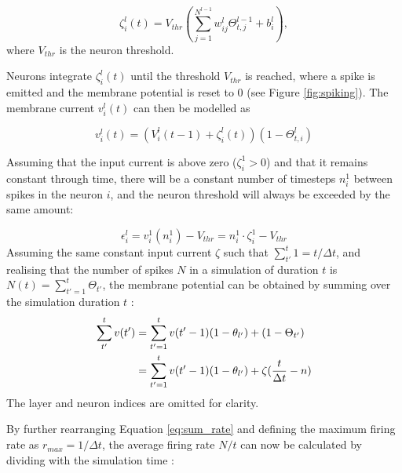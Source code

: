 \documentclass[report.tex]{subfiles}
\begin{document}
\begin{equation}
\zeta^l_i (t) = V_{thr}\left(\sum^{N^{l - 1}}_{j = 1} w^l_{ij} \Theta^{l - 1}_{t,j} + b^l_i\right) ,
\label{eq:membrane_timestep}
\end{equation}
\noindent
where $V_{thr}$ is the neuron threshold. 

Neurons integrate $\zeta_i^l(t)$ until the threshold $V_{thr}$ is 
reached, where a spike is emitted and the membrane potential is reset to 
0 (see Figure \ref{fig:spiking}).
The membrane current $v_i^l(t)$ can then be modelled as

\begin{equation}
v_i^l(t) = \left(V_i^l(t - 1) + \zeta_i^l(t)\right)\left(1 - \Theta_{t,i}^l\right)
\label{eq:membrane_current_sim}
\end{equation}

\noindent
Assuming that the input current is above zero ($\zeta_i^1 > 0$) and that it
remains constant through time, there will be a constant number of timesteps $n_i^1$
between spikes in the neuron $i$, and the neuron threshold will always be exceeded
by the same amount:

\begin{equation}
\epsilon_i^l = v_i^1(n_i^1) - V_{thr} = n_i^1 \cdot \zeta_i^1 - V_{thr}
\label{eq:threshold}
\end{equation}
\noindent
Assuming the same constant input current $\zeta$ such that $\sum_{t'}^t 1 = t/\Delta t$, 
and realising that the number of spikes $N$ in a simulation of duration $t$ is
$N(t) = \sum_{t'=1}^t\Theta_{t'}$, 
the membrane potential can be obtained by summing over the simulation duration $t$
\cite{Rueckauer2017}:
\begin{equation}
\begin{split}
\sum_{t'}^tv(t') &= \sum_{t'=1}^t v(t' - 1)(1 - \theta_{l'}) + (1 - \Theta_{t'}) \\
     		 &= \sum_{t'=1}^t v(t' - 1)(1 - \theta_{l'}) + \zeta({t \over \Delta t} - n) \\
\end{split}
\label{eq:sum_rate}
\end{equation}
\noindent
The layer and neuron indices are omitted for clarity.

By further rearranging Equation \ref{eq:sum_rate} and defining the maximum firing rate 
as $r_{max} = 1 / \Delta t$, the average firing rate $N/t$ can now
be calculated by dividing with the simulation time \cite{Rueckauer2017}:
\end{document}
